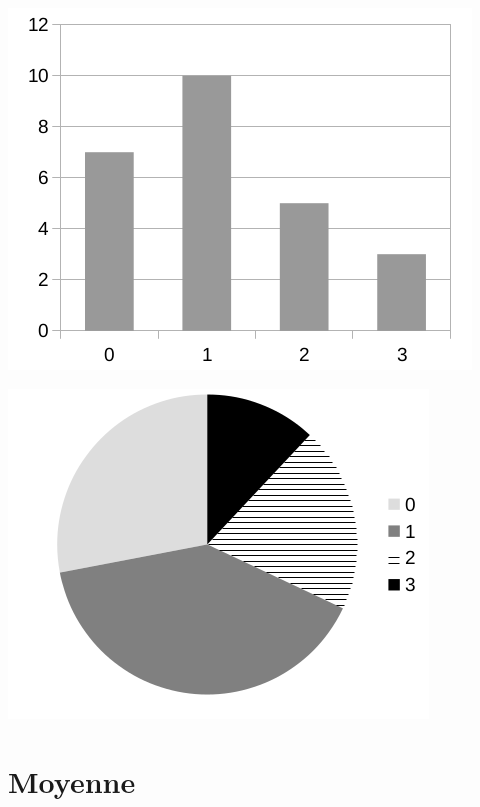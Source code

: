 \documentclass[12pt,a4paper]{article}
\begin{document}
\begin{myex}
	\vspace*{0.5cm}
	
	\begin{multicols}{2}
		\begin{center}
			\includegraphics[scale=0.4]{baton}
		\end{center}
	
		\begin{center}
			\includegraphics[scale=0.4]{circ}
		\end{center}
	\end{multicols}
	
\end{myex}

\newpage

\section{Moyenne}
\end{document}
